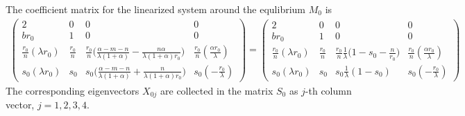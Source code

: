 \documentclass[a4paper,11pt]{article}
\theoremstyle{remark}
\begin{document}
The coefficient matrix for the linearized system around the equlibrium $M_0$ is
\begin{align*}
 \begin{pmatrix}
          2 & 0 & 0 & 0 \\
          br_0 & 1 & 0 & 0\\
          \frac{r_0}{n}(\lambda r_0) & \frac{r_0}{n} & \frac{r_0}{n}\Big(\frac{\alpha-m-n}{\lambda(1+\alpha)} - \frac{n\alpha}{\lambda(1+\alpha)r_0}\Big) & \frac{r_0}{n}(\frac{\alpha r_0}{\lambda})\\
          s_0(\lambda r_0) & s_0 & s_0\Big(\frac{\alpha-m-n}{\lambda(1+\alpha)} + \frac{n}{\lambda(1+\alpha)r_0}\Big) & s_0(-\frac{r_0}{\lambda})
         \end{pmatrix}
        =\begin{pmatrix}
          2 & 0 & 0 & 0 \\
          br_0 & 1 & 0 & 0\\
          \frac{r_0}{n}(\lambda r_0) & \frac{r_0}{n} & \frac{r_0}{n}\frac{1}{\lambda}\Big(1-s_0-\frac{n}{r_0}\Big) & \frac{r_0}{n}(\frac{\alpha r_0}{\lambda})\\
          s_0(\lambda r_0) & s_0 & s_0\frac{1}{\lambda}(1-s_0) & s_0(-\frac{r_0}{\lambda})
         \end{pmatrix}
\end{align*}
The corresponding eigenvectors $X_{0j}$ are collected in the matrix $S_0$ as $j$-th column vector, $j=1,2,3,4$.
\end{document}
